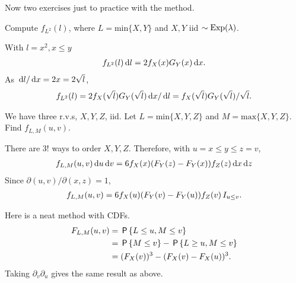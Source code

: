 \documentclass[a4paper,11pt]{article}
\renewcommand{\max}[1]{\mathrm{max}\{#1\}}
\renewcommand{\min}[1]{\mathrm{min}\{#1\}}
\begin{document}
Now two exercises just to practice with the method.

\begin{exercise}
Compute $f_{L^2}(l)$, where $L=\min{X,Y}$ and $X, Y$ iid $\sim \Exp{\lambda}$.
\begin{solution}
With $l = x^{2}, x\leq y$
\begin{align*}
f_{L^2}(l) \d l = 2f_{X}(x) G_{Y}(x) \d x.
\end{align*}
As $\d l/\d x = 2 x = 2 \sqrt l$,
\begin{align*}
f_{L^2}(l)  = 2f_{X}(\sqrt{l}) G_{Y}(\sqrt l ) \d x / \d l = f_{X}(\sqrt{l}) G_{Y}(\sqrt l ) /\sqrt l.
\end{align*}
\end{solution}

\end{exercise}


\begin{exercise}
We have three r.v.s, $X, Y, Z$, iid. Let $L=\min{X, Y, Z}$ and $M=\max{X, Y, Z}$. Find $f_{L,M}(u,v)$.
\begin{solution}
There are $3!$ ways to order $X, Y, Z$. Therefore, with $u=x \leq y \leq z = v$,
\begin{align*}
  f_{L,M}(u,v) \d u \d v= 6 f_{X}(x) (F_{Y}(z)-F_{Y}(x)) f_{Z}(z) \d x \d z
\end{align*}
Since $\partial(u,v)/\partial (x, z) = 1$,
\begin{align*}
  f_{L,M}(u,v) = 6 f_{X}(u) (F_{Y}(v)-F_{Y}(u)) f_{Z}(v)\1{u\leq v}.
\end{align*}

Here is a neat method with CDFs.
\begin{align*}
  F_{L,M}(u,v)
&= \P{L\leq u, M\leq v}\\
&= \P{M\leq v} - \P{L\geq u, M\leq v}\\
&= (F_{X}(v))^{3} - (F_{X}(v) - F_{X}(u))^{3}.
\end{align*}
Taking $\partial_{v}\partial_{u}$ gives the same result as above.
\end{solution}
\end{exercise}



\end{document}
